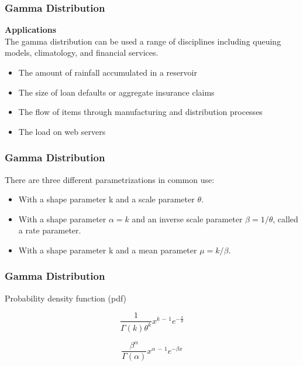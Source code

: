 \documentclass[IntroMain.tex]{subfiles}
\begin{document}
\begin{frame}
\frametitle{Gamma Distribution}
\Large
\textbf{Applications}\\
The gamma distribution can be used a range of disciplines including queuing models, climatology, and financial services. 
\begin{itemize}
\item The amount of rainfall accumulated in a reservoir
\item The size of loan defaults or aggregate insurance claims
\item The flow of items through manufacturing and distribution processes
\item The load on web servers
\end{itemize}

\end{frame}
\begin{frame}
	\frametitle{Gamma Distribution}
	\Large
There are three different parametrizations in common use: \bigskip
\begin{itemize}
\item With a shape parameter k and a scale parameter $\theta$. \bigskip
\item With a shape parameter $\alpha = k$ and an inverse scale parameter $\beta = 1/\theta$, called a rate parameter. \bigskip
\item With a shape parameter k and a mean parameter $\mu = k/\beta$.
\end{itemize}
\end{frame}
\begin{frame}
	\frametitle{Gamma Distribution}
	\large
Probability density function (pdf)	

\[{\frac {1}{\Gamma (k)\theta ^{k}}}x^{k\,-\,1}e^{-{\frac {x}{\theta }}}\]	

\[{\frac {\beta ^{\alpha }}{\Gamma (\alpha )}}x^{\alpha \,-\,1}e^{-\beta x}\]

\end{frame}
\end{document}
